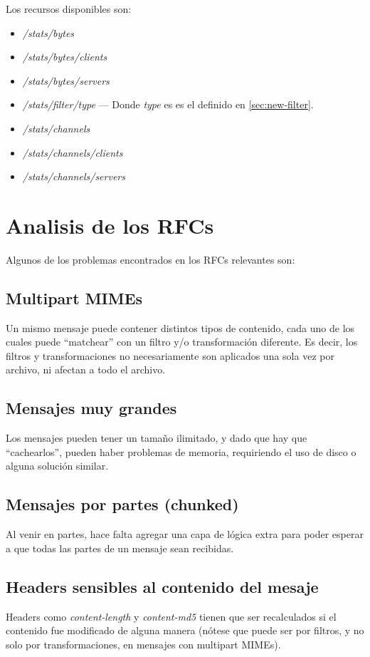 \documentclass[11pt,a4paper,titlepage]{article}
\begin{document}
Los recursos disponibles son:
\begin{itemize}
    \item \textit{/stats/bytes}
    \item \textit{/stats/bytes/clients}
    \item \textit{/stats/bytes/servers}
    \item \textit{/stats/filter/type} --- Donde \textit{type} es es el definido en \ref{sec:new-filter}.
    \item \textit{/stats/channels}
    \item \textit{/stats/channels/clients}
    \item \textit{/stats/channels/servers}
\end{itemize}

\section{Analisis de los RFCs}
Algunos de los problemas encontrados en los RFCs relevantes son:

\subsection{Multipart MIMEs}
Un mismo mensaje puede contener distintos tipos de contenido, cada uno de los cuales
puede ``matchear'' con un filtro y/o transformación diferente. Es decir, los filtros y transformaciones
no necesariamente son aplicados una sola vez por archivo, ni afectan a todo el archivo.

\subsection{Mensajes muy grandes}
Los mensajes pueden tener un tamaño ilimitado, y dado que hay que ``cachearlos'', pueden haber problemas
de memoria, requiriendo el uso de disco o alguna solución similar.

\subsection{Mensajes por partes (chunked)}
Al venir en partes, hace falta agregar una capa de lógica extra para poder esperar a que todas las
partes de un mensaje sean recibidas.

\subsection{Headers sensibles al contenido del mesaje}
Headers como \textit{content-length} y \textit{content-md5} tienen que ser recalculados si el contenido fue modificado
de alguna manera (nótese que puede ser por filtros, y no solo por transformaciones, en mensajes con multipart MIMEs).
\end{document}
